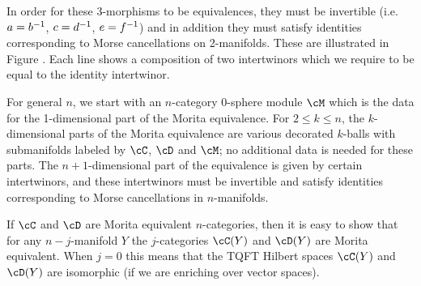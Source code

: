 In order for these 3-morphisms to be equivalences, 
they must be invertible (i.e.\ $a=b^{-1}$, $c=d^{-1}$, $e=f^{-1}$) and in addition
they must satisfy identities corresponding to Morse cancellations on 2-manifolds.
These are illustrated in Figure .
Each line shows a composition of two intertwinors which we require to be equal to the identity intertwinor.

For general $n$, we start with an $n$-category 0-sphere module $\cM$ which is the data for the 1-dimensional
part of the Morita equivalence.
For $2\le k \le n$, the $k$-dimensional parts of the Morita equivalence are various decorated $k$-balls with submanifolds
labeled by $\cC$, $\cD$ and $\cM$; no additional data is needed for these parts.
The $n{+}1$-dimensional part of the equivalence is given by certain intertwinors, and these intertwinors must 
be invertible and satisfy
identities corresponding to Morse cancellations in $n$-manifolds. 


If $\cC$ and $\cD$ are Morita equivalent $n$-categories, then it is easy to show that for any $n-j$-manifold
$Y$ the $j$-categories $\cC(Y)$ and $\cD(Y)$ are Morita equivalent.
When $j=0$ this means that the TQFT Hilbert spaces $\cC(Y)$ and $\cD(Y)$ are isomorphic 
(if we are enriching over vector spaces).





